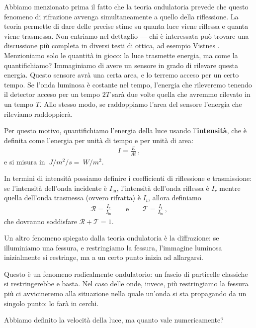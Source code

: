 \documentclass[a4paper,12pt]{article}
\begin{document}
Abbiamo menzionato prima il fatto che la teoria ondulatoria prevede che questo fenomeno di rifrazione avvenga simultaneamente a quello della riflessione. 
La teoria permette di dare delle precise stime su quanta luce viene riflessa e quanta viene trasmessa. Non entriamo nel dettaglio --- chi è interessata può trovare una discussione più completa in diversi testi di ottica, ad esempio Vistnes \cite[]{vistnesReflectionTransmissionPolarization2018}. Menzioniamo solo le quantità in gioco: la luce trasmette energia, ma come la quantifichiamo? 
Immaginiamo di avere un sensore in grado di rilevare questa energia. Questo sensore avrà una certa area, e lo terremo acceso per un certo tempo. 
Se l'onda luminosa è costante nel tempo, l'energia che rileveremo tenendo il detector acceso per un tempo \(2T\) sarà due volte quella che avremmo rilevato in un tempo \(T\). Allo stesso modo, se raddoppiamo l'area del sensore l'energia che rileviamo raddoppierà.

Per questo motivo, quantifichiamo l'energia della luce usando l'\textbf{intensità}, che è definita come l'energia per unità di tempo e per unità di area: 
%
\begin{align}
I = \frac{E}{A t}
\,,
\end{align}
%
e si misura in \(\SI{}{J / m^2 / s}  = \SI{}{W/m^2}\). 

In termini di intensità possiamo definire i coefficienti di riflessione e trasmissione: se l'intensità dell'onda incidente è \(I _{\text{in}}\), l'intensità dell'onda riflessa è \(I_{r}\) mentre quella dell'onda trasmessa (ovvero rifratta) è \(I_{t}\), allora definiamo 
%
\begin{align}
\mathcal{R} = \frac{I_r}{I _{\text{in}}}
\qquad \text{e} \qquad
\mathcal{T} = \frac{I_t}{I _{\text{in}}}
\,,
\end{align}
%
che dovranno soddisfare \(\mathcal{R} + \mathcal{T} = 1\).

Un altro fenomeno spiegato dalla teoria ondulatoria è la diffrazione: se illuminiamo una fessura, e restringiamo la fessura, l'immagine luminosa inizialmente si restringe, ma a un certo punto inizia ad allargarsi.

Questo è un fenomeno radicalmente ondulatorio: un fascio di particelle classiche si restringerebbe e basta.
Nel caso delle onde, invece, più restringiamo la fessura più ci avvicineremo alla situazione nella quale un'onda si sta propagando da un singolo punto: lo farà in cerchi. 

Abbiamo definito la velocità della luce, ma quanto vale numericamente? 
\end{document}
